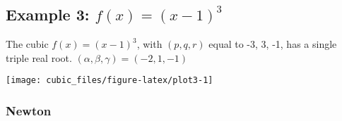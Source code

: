 \documentclass[
  12pt,
]{article}
\begin{document}
\normalsize

\subsection{\texorpdfstring{Example 3: \(f(x)=(x-1)^3\)}{Example 3: f(x)=(x-1)\^{}3}}\label{example-3-fxx-13}

\footnotesize

\normalsize
The cubic \(f(x)=(x-1)^3\), with \((p,q,r)\) equal to -3, 3, -1, has
a single triple real root. \((\alpha,\beta,\gamma)=(-2, 1, -1)\)

\footnotesize

\begin{center}\texttt{[image: cubic\_files/figure-latex/plot3-1]} \end{center}

\normalsize

\subsubsection{Newton}\label{newton-2}

\footnotesize
\end{document}
